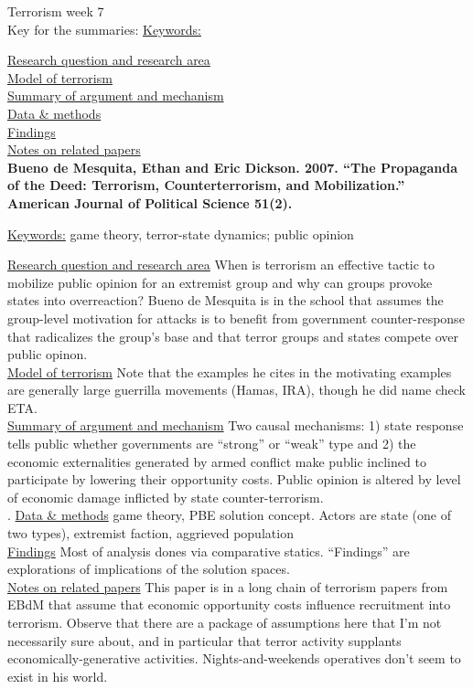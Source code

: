 \documentclass{article}[12pt]
\begin{document}
Terrorism week 7\\

Key for the summaries:
\underline{Keywords:}

\underline{Research question and research area}\\
\underline{Model of terrorism}\\
\underline{Summary of argument and mechanism}\\
\underline{Data \& methods}\\
\underline{Findings}\\
\underline{Notes on related papers}\\

\textbf{Bueno de Mesquita, Ethan and Eric Dickson. 2007. “The Propaganda of the Deed: Terrorism,
Counterterrorism, and Mobilization.” American Journal of Political Science 51(2).}

\underline{Keywords:} game theory, terror-state dynamics; public opinion

\underline{Research question and research area} When is terrorism an effective tactic to mobilize public opinion for an extremist group and why can groups provoke states into overreaction? Bueno de Mesquita is in the school that assumes the group-level motivation for attacks is to benefit from government counter-response that radicalizes the group's base and that terror groups and states compete over public opinon.\\
\underline{Model of terrorism} Note that the examples he cites in the motivating examples are generally large guerrilla movements (Hamas, IRA), though he did name check ETA. \\
\underline{Summary of argument and mechanism} Two causal mechanisms: 1) state response tells public whether governments are ``strong'' or ``weak'' type and 2) the economic externalities generated by armed conflict make public inclined to participate by lowering their opportunity costs. Public opinion is altered by level of economic damage inflicted by state counter-terrorism.\\.
\underline{Data \& methods} game theory, PBE solution concept. Actors are state (one of two types), extremist faction, aggrieved population \\
\underline{Findings} Most of analysis dones via comparative statics. ``Findings'' are explorations of implications of the solution spaces.\\
\underline{Notes on related papers} This paper is in a long chain of terrorism papers from EBdM that assume that economic opportunity costs influence recruitment into terrorism. Observe that there are a package of assumptions here that I'm not necessarily sure about, and in particular that terror activity supplants economically-generative activities. Nights-and-weekends operatives don't seem to exist in his world. \\
\end{document}
